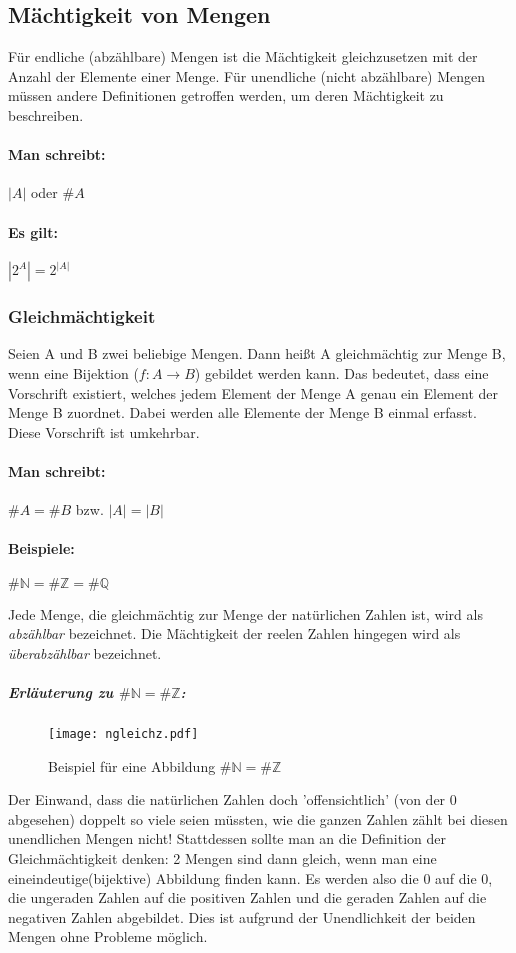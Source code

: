 \subsection{Mächtigkeit von Mengen}
Für endliche (abzählbare) Mengen ist die Mächtigkeit gleichzusetzen mit der Anzahl
der Elemente einer Menge. Für unendliche (nicht abzählbare) Mengen müssen andere
Definitionen getroffen werden, um deren Mächtigkeit zu beschreiben.
\paragraph{Man schreibt:}
\({}|{}A{}|{}\) oder \(\#A\)
\paragraph{Es gilt:}
\begin{math}
{}|{}2^A{}|{} = 2^{{}|{}A{}|{}}
\end{math}
\subsubsection*{Gleichmächtigkeit}
Seien A und B zwei beliebige Mengen.
Dann heißt A gleichmächtig zur Menge B, wenn eine Bijektion (\({f:A}\rightarrow{B}\)) gebildet
werden kann. Das bedeutet, dass eine Vorschrift existiert, welches
jedem Element der Menge A genau ein Element der Menge B zuordnet.
Dabei werden alle Elemente der Menge B einmal erfasst. Diese
Vorschrift ist umkehrbar.
\paragraph{Man schreibt:} \(\#A = \#B\) bzw. \(|A| = |B|\)
\paragraph*{Beispiele:}
\begin{math}
\#{\mathbb N} = \#{\mathbb Z} = \#{\mathbb Q}
\end{math}

Jede Menge, die gleichmächtig zur Menge der natürlichen Zahlen ist, wird als \emph{abzählbar} bezeichnet.
Die Mächtigkeit der reelen Zahlen hingegen wird als \emph{überabzählbar} bezeichnet.
\subparagraph{Erläuterung zu \(\#{\mathbb N} = \#{\mathbb Z}\):} 
\begin{figure}[b]
  \centering
  \caption{Beispiel für eine Abbildung \(\#{\mathbb N} = \#{\mathbb Z}\)}
  \texttt{[image: ngleichz.pdf]}
\end{figure}
Der Einwand, dass die natürlichen Zahlen doch 'offensichtlich' (von der 0
abgesehen) doppelt so viele seien müssten, wie die ganzen Zahlen zählt
bei diesen unendlichen Mengen nicht! Stattdessen sollte man an die
Definition der Gleichmächtigkeit denken: 2 Mengen sind dann gleich,
wenn man eine eineindeutige(bijektive) Abbildung finden kann.
Es werden also die 0 auf die 0, die ungeraden Zahlen auf die positiven
Zahlen und die geraden Zahlen auf die negativen Zahlen abgebildet.
Dies ist aufgrund der Unendlichkeit der beiden Mengen ohne Probleme
möglich.

